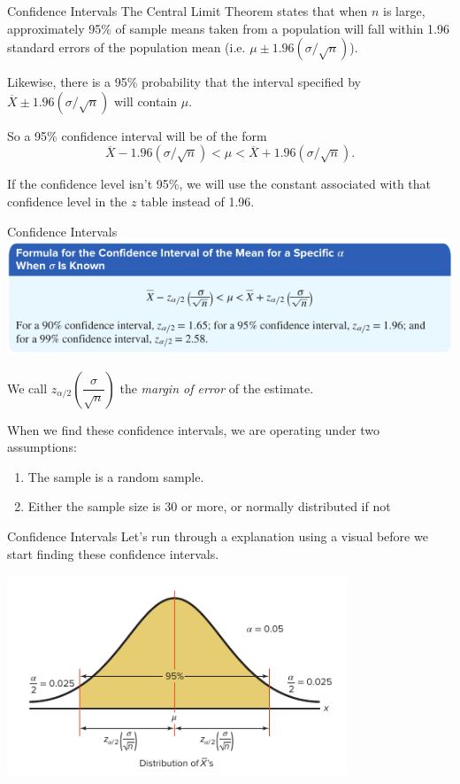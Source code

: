 \documentclass[t, aspectratio=169]{beamer}
\newcommand{\fp}[1]{\left({#1}\right)} %
\newcommand{\?}{\stackrel{?}{=}}
\begin{document}
	\begin{frame}{Confidence Intervals}
		The Central Limit Theorem states that when $n$ is large, approximately 95\% of sample means taken from a population will fall within 1.96 standard errors of the population mean (i.e. $\mu \pm 1.96(\sigma/\sqrt{n})$). \pause
		
		Likewise, there is a 95\% probability that the interval specified by $\overline{X} \pm 1.96(\sigma/\sqrt{n})$ will contain $\mu$. \pause
		
		So a 95\% confidence interval will be of the form $$\overline{X} - 1.96(\sigma/\sqrt{n}) < \mu < \overline{X} + 1.96(\sigma/\sqrt{n}).$$ \pause
		
		If the confidence level isn't 95\%, we will use the constant associated with that confidence level in the $z$ table instead of 1.96.
	\end{frame}

	\begin{frame}{Confidence Intervals}
		\includegraphics[width=\textwidth]{ci-formula.png} \pause
		
		We call $z_{\alpha / 2}\fp{\dfrac{\sigma}{\sqrt{n}}}$ the \textit{margin of error} of the estimate. \pause
		
		When we find these confidence intervals, we are operating under two assumptions: \begin{enumerate}[1)]
			\item The sample is a random sample.
			\item Either the sample size is 30 or more, or normally distributed if not
		\end{enumerate}
	\end{frame}

	\begin{frame}{Confidence Intervals}
		Let's run through a explanation using a visual before we start finding these confidence intervals.
		
		\includegraphics[width=4in]{ci-visual.png}
	\end{frame}
\end{document}

